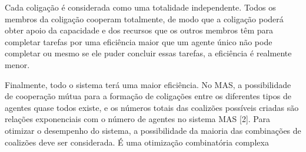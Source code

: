 Cada coligação é considerada como uma totalidade independente. Todos os membros da coligação cooperam totalmente, de modo que a coligação poderá obter apoio da capacidade e dos recursos que os outros membros têm para completar tarefas por uma eficiência maior que um agente único não pode completar ou mesmo se ele puder concluir essas tarefas, a eficiência é realmente menor.

Finalmente, todo o sistema terá uma maior eficiência. No MAS, a possibilidade de cooperação mútua para a formação de coligações entre os diferentes tipos de agentes quase todos existe, e os números totais das coalizões possíveis criadas são relações exponenciais com o número de agentes no sistema MAS [2]. Para otimizar o desempenho do sistema, a possibilidade da maioria das combinações de coalizões deve ser considerada. É uma otimização combinatória complexa

